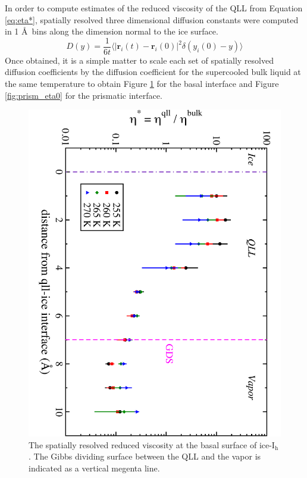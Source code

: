In order to compute estimates of the reduced viscosity of the QLL from
Equation \eqref{eq:eta*}, spatially resolved three dimensional
diffusion constants were computed in 1 \AA~bins along the dimension
normal to the ice surface.
\begin{equation}\label{eq:yDiff}
D(y) = \frac{1}{6t} \langle | \mathbf{r}_i(t) - \mathbf{r}_i(0) |^2
\delta(y_i(0) - y)  \rangle 
\end{equation}
Once obtained, it is a simple matter to scale each set of spatially
resolved diffusion coefficients by the diffusion coefficient for the
supercooled bulk liquid at the same temperature to obtain Figure
\ref{fig:basal_eta0} for the basal interface and Figure
\ref{fig:prism_eta0} for the prismatic interface. 

\begin{figure}
\includegraphics[width=\linewidth]{Figures/basal_eta0}
\caption{\label{fig:basal_eta0}The spatially resolved reduced
  viscosity at the basal surface of ice-I$_\mathrm{h}$. The Gibbs
  dividing surface between the QLL and the vapor is indicated as a
  vertical megenta line.}
\end{figure}                

